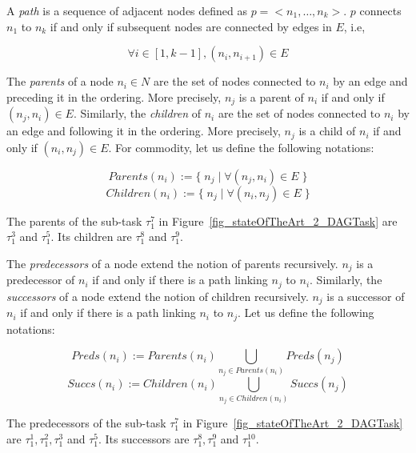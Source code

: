 \documentclass[main.tex]{subfiles}
\begin{document}
A \emph{path} is a sequence of adjacent nodes defined as $p = <n_1 , \ldots ,
n_k>$. $p$ connects $n_1$ to $n_k$ if and only if subsequent nodes are
connected by edges in $E$, i.e, 

\begin{displaymath}
\forall i \in [1, k-1] , (n_i, n_{i+1}) \in E
\end{displaymath}


The \emph{parents} of a node $n_i \in N$  are the set of nodes connected to
$n_i$ by an edge and preceding it in the ordering. More precisely, $n_j$ is a
parent of $n_i$ if and only if $ (n_j, n_i) \in E$. Similarly, the
\emph{children} of $n_i$ are the set of nodes connected to $n_i$ by an edge and
following it in the ordering. More precisely, $n_j$ is a child of $n_i$ if and
only if $ (n_i, n_j) \in E$. For commodity, let us define the following
notations:

\begin{displaymath}
    Parents ( n_i ) := \{ \; n_j \; | \; \forall (n_j,n_i) \in E \; \}
\end{displaymath}
\begin{displaymath}
    Children ( n_i ) := \{ \; n_j \; | \; \forall (n_i,n_j) \in E \;\}
\end{displaymath}

\begin{example}
    The parents of the sub-task $\tau_1^7$ in
    Figure~\ref{fig_stateOfTheArt_2_DAGTask} are $\tau_1^3$ and $\tau_1^5$. Its
    children are $\tau_1^8$ and $\tau_1^9$.
\end{example}

The \emph{predecessors} of a node extend the notion of parents recursively.
$n_j$ is a predecessor of $n_i$ if and only if there is a path linking $n_j$ to
$n_i$. Similarly, the \emph{successors} of a node extend the notion of children
recursively. $n_j$ is a successor of $n_i$ if and only if there is a path
linking $n_i$ to $n_j$. Let us define the following notations:


\begin{displaymath}
    Preds ( n_i ) := Parents (n_i) \underset{n_j \in Parents(n_i)}{\bigcup} Preds (n_j)
\end{displaymath}
\begin{displaymath}
    Succs ( n_i ) := Children (n_i) \underset{n_j \in Children(n_i)}{\bigcup} Succs (n_j)
\end{displaymath}


\begin{example}
    The predecessors of the sub-task $\tau_1^7$ in
    Figure~\ref{fig_stateOfTheArt_2_DAGTask} are $\tau_1^1, \tau_1^2, \tau_1^3$
    and $\tau_1^5$. Its successors are $\tau_1^8, \tau_1^9$ and $\tau_1^{10}$.
\end{example}
\end{document}
